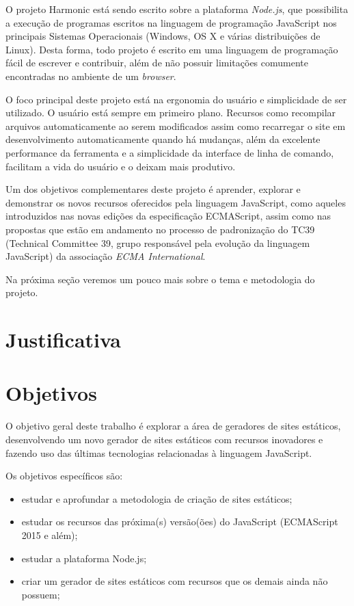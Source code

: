 \documentclass[ppginf, pep]{esinucpel}
\begin{document}
O projeto Harmonic está sendo escrito sobre a plataforma \emph{Node.js}, que possibilita a execução de programas escritos na linguagem de programação JavaScript nos principais Sistemas Operacionais (Windows, OS X e várias distribuições de Linux). Desta forma, todo projeto é escrito em uma linguagem de programação fácil de escrever e contribuir, além de não possuir limitações comumente encontradas no ambiente de um \textit{browser}.

O foco principal deste projeto está na ergonomia do usuário e simplicidade de ser utilizado. O usuário está sempre em primeiro plano. Recursos como recompilar arquivos automaticamente ao serem modificados assim como recarregar o site em desenvolvimento automaticamente quando há mudanças, além da excelente performance da ferramenta e a simplicidade da interface de linha de comando, facilitam a vida do usuário e o deixam mais produtivo.

Um dos objetivos complementares deste projeto é aprender, explorar e demonstrar os novos recursos oferecidos pela linguagem JavaScript, como aqueles introduzidos nas novas edições da especificação ECMAScript, assim como nas propostas que estão em andamento no processo de padronização do TC39 (Technical Committee 39, grupo responsável pela evolução da linguagem JavaScript) da associação \textit{ECMA International}. %

Na próxima seção veremos um pouco mais sobre o tema e metodologia do projeto. %



\section{Justificativa}

\section{Objetivos}

O objetivo geral deste trabalho é explorar a área de geradores de sites estáticos, desenvolvendo um novo gerador de sites estáticos com recursos inovadores e fazendo uso das últimas tecnologias relacionadas à linguagem JavaScript.

Os objetivos específicos são:
\begin{itemize}
	
	\item estudar e aprofundar a metodologia de criação de sites estáticos;
	\item estudar os recursos das próxima(s) versão(ões) do JavaScript (ECMAScript 2015 e além);
	\item estudar a plataforma Node.js;
    \item criar um gerador de sites estáticos com recursos que os demais ainda não possuem;

\end{itemize}
\end{document}
